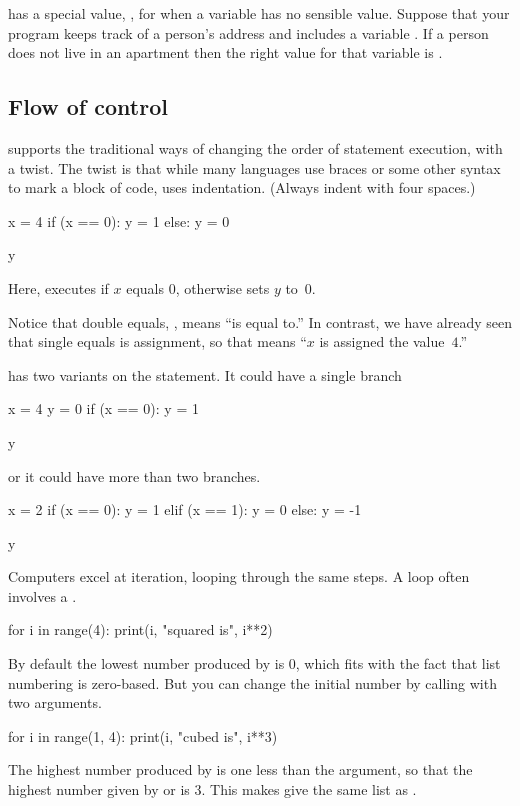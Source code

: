 \python{} has a special value, , for
when a variable has no sensible value.
Suppose that your program keeps track of a person's address and
includes a variable .  
If a person does not live in an
apartment then the right value for that variable is .



\subsection{Flow of control}
\python{} supports the traditional ways of changing the order of 
statement execution, with a twist.
The twist is that while many languages use braces or some other syntax to
mark a block of code, \python{} uses indentation.
(Always indent with four spaces.)
\begin{pythonconsole}
x = 4
if (x == 0):
    y = 1
else:
    y = 0

y
\end{pythonconsole}
\noindent
Here, \python{} executes  if $x$
equals $0$, otherwise \python{} sets $y$ to~$0$. 

Notice that double equals, \inlinecode{==}, means ``is equal to.'' 
In contrast, we have already seen that single equals is assignment,
so that  
means ``$x$ is assigned the value~$4$.'' 

\python{} has two variants on the  statement.
It could have a single branch
\begin{pythonconsole}
x = 4
y = 0
if (x == 0):
    y = 1

y
\end{pythonconsole}
or it could have more than two branches.
\begin{pythonconsole}
x = 2
if (x == 0):
    y = 1
elif (x == 1):
    y = 0
else:
    y = -1

y
\end{pythonconsole}

Computers excel at iteration, looping through the same steps.
A  loop often involves a .
\begin{pythonconsole}
for i in range(4):
    print(i, "squared is", i**2)

\end{pythonconsole}
\noindent
By default the lowest number produced by  is $0$, which
fits with the fact that list numbering is zero-based.
But you can change the initial number by calling  
with two arguments.
\begin{pythonconsole}
for i in range(1, 4):
    print(i, "cubed is", i**3)

\end{pythonconsole}
The highest number produced by  is one less than the 
argument, so that the highest number
given by  or  is $3$.
This makes  give 
the same list as .

